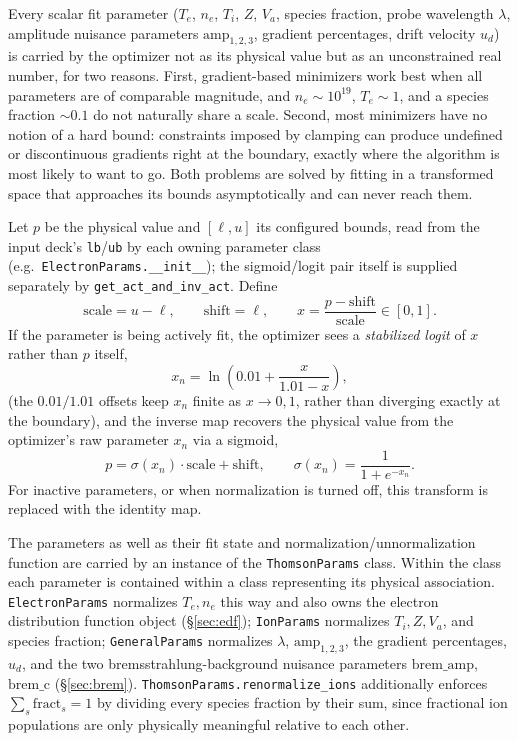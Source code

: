 \documentclass[11pt]{article}
\newcommand{\code}[1]{\texttt{#1}}
\begin{document}
Every scalar fit parameter ($T_e$, $n_e$, $T_i$, $Z$, $V_a$, species fraction, probe
wavelength $\lambda$, amplitude nuisance parameters $\mathrm{amp}_{1,2,3}$, gradient
percentages, drift velocity $u_d$) is carried by the optimizer not as its physical value
but as an unconstrained real number, for two reasons. First, gradient-based minimizers
work best when all parameters are of comparable magnitude, and $n_e\sim10^{19}$,
$T_e\sim1$, and a species fraction $\sim0.1$ do not naturally share a scale. Second, most
minimizers have no notion of a hard bound: constraints imposed by clamping can produce
undefined or discontinuous gradients right at the boundary, exactly where the algorithm is
most likely to want to go. Both problems are solved by fitting in a transformed space that
approaches its bounds asymptotically and can never reach them.

Let $p$ be the physical value and $[\ell,u]$ its configured bounds, read from the input
deck's \code{lb}/\code{ub} by each owning parameter class (e.g.\ \code{ElectronParams.\_\_init\_\_});
the sigmoid/logit pair itself is supplied separately by \code{get\_act\_and\_inv\_act}. Define
\begin{equation}
  \text{scale} = u-\ell,\qquad \text{shift}=\ell,\qquad x=\frac{p-\text{shift}}{\text{scale}}\in[0,1].
\end{equation}
If the parameter is being actively fit, the optimizer sees a \emph{stabilized logit} of $x$
rather than $p$ itself,
\begin{equation}
  x_n = \ln\!\left(0.01+\frac{x}{1.01-x}\right),
\end{equation}
(the $0.01/1.01$ offsets keep $x_n$ finite as $x\to0,1$, rather than diverging exactly at
the boundary), and the inverse map recovers the physical value from the optimizer's raw
parameter $x_n$ via a sigmoid,
\begin{equation}
  p = \sigma(x_n)\cdot\text{scale}+\text{shift}, \qquad \sigma(x_n)=\frac{1}{1+e^{-x_n}}.
\end{equation}
For inactive parameters, or when normalization is turned off, this transform is replaced with the identity map.

The parameters as well as their fit state and normalization/unnormalization function are carried by an instance of the \code{ThomsonParams} class. Within the class each parameter is contained within a class representing its physical association.
\code{ElectronParams} normalizes $T_e,n_e$ this way and also owns the electron distribution
function object (\S\ref{sec:edf}); \code{IonParams} normalizes $T_i,Z,V_a$, and species
fraction; \code{GeneralParams} normalizes $\lambda$, $\mathrm{amp}_{1,2,3}$, the gradient
percentages, $u_d$, and the two bremsstrahlung-background nuisance parameters
$\mathrm{brem\_amp}$, $\mathrm{brem\_c}$ (\S\ref{sec:brem}). 
\code{ThomsonParams.renormalize\_ions} additionally enforces
$\sum_s\mathrm{fract}_s=1$ by dividing every species fraction by their sum, since fractional
ion populations are only physically meaningful relative to each other.
\end{document}
